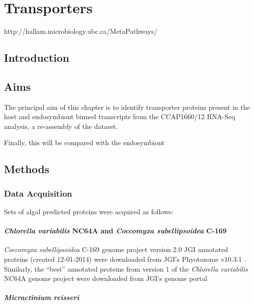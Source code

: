\graphicspath{{chapters/5.Chapter_3/figures}}

\chapter{Transporters}

http://hallam.microbiology.ubc.ca/MetaPathways/

\section{Introduction}

\section{Aims}

The principal aim of this chapter is to identify
transporter proteins present in the host and endosymbiont
binned transcripts from the CCAP1660/12 RNA-Seq analysis,
a re-assembly of the \citep{Kodama2014c} dataset.

Finally, this will be compared with the 
endosymbiont 


\section{Methods}

\subsection{Data Acquisition}

Sets of algal predicted proteins were acquired as follows:

\subsubsection{\textit{Chlorella variabilis} NC64A and \textit{Coccomyxa subellipsoidea} C-169} 
 
\textit{Coccomyxa subellipsoidea} C-169 genome project \citep{Blanc2012} version 2.0 
JGI annotated proteins (created 12-01-2014) were downloaded from JGI's
Phyotozome v10.3.1 \citep{Goodstein2012}. 
Similarly, the ``best'' annotated proteins from
version 1 of the \textit{Chlorella variabilis} NC64A genome project \citep{Blanc2010}
were downloaded from JGI's genome portal \citep{Grigoriev2011,Nordberg2014}

\subsubsection{\textit{Micractinium reisseri}}

